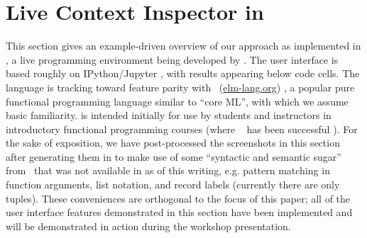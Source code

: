 \newcommand{\examplesSec}{Live Context Inspector in \Hazel}
\section{\examplesSec} %
\label{sec:examples}

\newcommand{\overviewExample}[2]{\paragraph{Example {#1}: {#2}}}

This section gives an example-driven overview of our approach as implemented in  \Hazel, a live programming environment being developed by \citet{HazelnutSNAPL}. The \Hazel user interface is based roughly on IPython/Jupyter \cite{PER-GRA:2007}, with results appearing below code cells. 
The \Hazel language is tracking toward feature parity with \Elm~(\url{elm-lang.org}) \cite{czaplicki2012elm,Elm}, a popular pure functional programming language similar to ``core ML'', with which we assume basic familiarity. 
\Hazel is intended initially for use by students and instructors in introductory functional programming courses (where \Elm~ has been successful \cite{DBLP:journals/corr/abs-1805-05125}). 
For the sake of 
exposition, we have post-processed the screenshots in this section after generating them in \Hazel to make use of some ``syntactic and semantic sugar'' from \Elm~that was not available in \Hazel as of this writing, e.g. pattern matching in function arguments, list  notation, and record labels (currently there are only tuples). These conveniences are orthogonal to the focus of this paper; all of the user interface features demonstrated in this section have been implemented and will be demonstrated in action during the workshop presentation.



% 
% 



